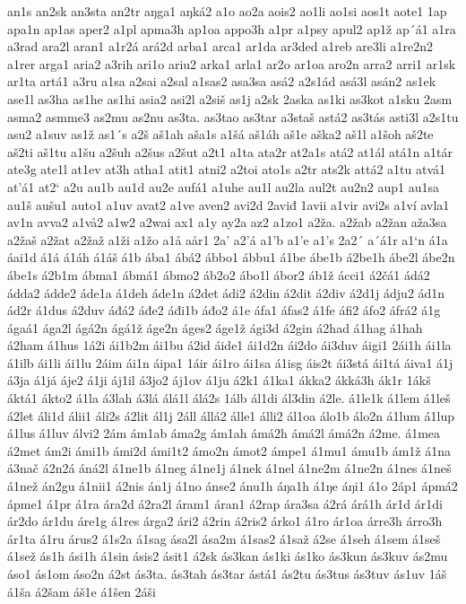 an1s
an2sk
an3sta
an2tr
aŋga1
aŋká2
a1o
ao2a
aois2
ao1li
ao1si
aos1t
aote1
1ap
apa1n
ap1as
aper2
a1pl
apma3h
ap1oa
appo3h
a1pr
a1psy
apul2
ap1ž
ap´á1
a1ra
a3rad
ara2l
aran1
a1r2á
ará2d
arba1
arca1
ar1da
ar3ded
a1reb
are3li
a1re2n2
a1rer
arga1
aria2
a3rih
ari1o
ariu2
arka1
arla1
ar2o
ar1oa
aro2n
arra2
arri1
ar1sk
ar1ta
artá1
a3ru
a1sa
a2sai
a2sal
a1sas2
asa3sa
asá2
a2s1ád
asá3l
asán2
as1ek
ase1l
as3ha
as1he
as1hi
asia2
asi2l
a2siš
as1j
a2sk
2aska
as1ki
as3kot
a1sku
2asm
asma2
asmme3
as2mu
as2nu
as3ta.
as3tao
as3tar
a3staš
astá2
as3tás
asti3l
a2s1tu
asu2
a1suv
as1ž
as1´s
a2š
aš1ah
aša1s
a1šá
aš1áh
aš1e
aška2
aš1l
a1šoh
aš2te
aš2ti
aš1tu
a1šu
a2šuh
a2šus
a2šut
a2t1
a1ta
ata2r
at2a1s
atá2
at1ál
atá1n
a1tár
ate3g
ate1l
at1ev
at3h
atha1
atit1
atni2
a2toi
ato1s
a2tr
ats2k
attá2
a1tu
atvá1
at'á1
at2`
a2u
au1b
au1d
au2e
aufá1
a1uhe
au1l
au2la
aul2t
au2n2
aup1
au1sa
au1š
aušu1
auto1
a1uv
avat2
a1ve
aven2
avi2d
2aviđ
1avii
a1vir
avi2s
a1ví
avla1
av1n
avva2
a1vå2
a1w2
a2wai
ax1
a1y
ay2a
az2
a1zo1
a2ža.
a2žab
a2žan
aža3sa
a2žaš
a2žat
a2žaž
a1ži
a1žo
a1å
aår1
2a'
a2'á
a1'b
a1'e
a1's
2a2´
a´á1r
a1`n
á1a
áai1d
á1á
á1áh
á1áš
á1b
ába1
ábá2
ábbo1
ábbu1
á1be
ábe1b
á2be1h
ábe2l
ábe2n
ábe1s
á2b1m
ábma1
ábmá1
ábmo2
áb2o2
ábo1l
ábor2
áb1ž
ácci1
á2čá1
ádá2
ádda2
ádde2
áde1a
á1deh
áde1n
á2det
ádi2
á2din
á2dit
á2div
á2d1j
ádju2
ád1n
ád2r
á1dus
á2duv
áđá2
áđe2
áđi1b
áđo2
á1e
áfa1
áfas2
á1fe
áfi2
áfo2
áfrá2
á1g
ágaá1
ága2l
ágá2n
ágá1ž
áge2n
áges2
áge1ž
ági3d
á2gin
á2had
á1hag
á1hah
á2ham
á1hus
1á2i
ái1b2m
ái1bu
á2id
áide1
ái1d2n
ái2do
ái3duv
áigi1
2ái1h
ái1la
á1ilb
ái1li
ái1lu
2áim
ái1n
áipa1
1áir
ái1ro
ái1sa
á1isg
áis2t
ái3stá
ái1tá
áiva1
á1j
á3ja
á1já
áje2
á1ji
áj1il
á3jo2
áj1ov
á1ju
á2k1
á1ka1
ákka2
ákká3h
ák1r
1ákš
áktá1
ákto2
á1la
á3lah
á3lá
álá1l
álá2s
1álb
ál1di
ál3din
á2le.
á1le1k
á1lem
á1leš
á2let
áli1d
álii1
áli2s
á2lit
ál1j
2áll
állá2
álle1
álli2
ál1oa
álo1b
álo2n
á1lum
á1lup
á1lus
á1luv
álvi2
2ám
ám1ab
áma2g
ám1ah
ámá2h
ámá2l
ámá2n
á2me.
á1mea
á2met
ám2i
ámi1b
ámi2d
ámi1t2
ámo2n
ámot2
ámpe1
á1mu1
ámu1b
ám1ž
á1na
á3nač
á2n2á
áná2l
á1ne1b
á1neg
á1ne1j
á1nek
á1nel
á1ne2m
á1ne2n
á1nes
á1neš
á1než
án2gu
á1nii1
á2nis
án1j
á1no
ánse2
ánu1h
áŋa1h
á1ŋe
áŋi1
á1o
2áp1
ápmá2
ápme1
á1pr
á1ra
ára2d
á2ra2l
áram1
áran1
á2rap
ára3sa
á2rá
árá1h
ár1d
ár1di
ár2do
ár1du
áre1g
á1res
árga2
ári2
á2rin
á2ris2
árko1
á1ro
ár1oa
árre3h
árro3h
ár1ta
á1ru
árus2
á1s2a
á1sag
ása2l
ása2m
á1sas2
á1saž
á2se
á1seh
á1sem
á1seš
á1sež
ás1h
ási1h
á1sin
ásis2
ásit1
á2sk
ás3kan
ás1ki
ás1ko
ás3kun
ás3kuv
ás2mu
áso1
ás1om
áso2n
á2st
ás3ta.
ás3tah
ás3tar
ástá1
ás2tu
ás3tus
ás3tuv
ás1uv
1áš
á1ša
á2šam
áš1e
á1šen
2áši
